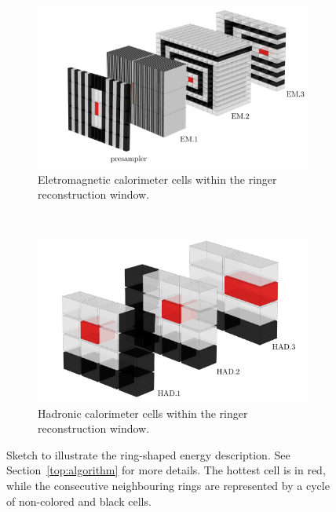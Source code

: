 \begin{figure}[h!t]
	\centering
	\begin{center}
		\begin{subfigure}[c]{0.8\textwidth}
			\centering
			\includegraphics[width=\textwidth]{sections/ringer/figures/ATLAS_EM_Layers_v5.pdf}
			\caption{Eletromagnetic calorimeter cells within the ringer reconstruction window.}
		\end{subfigure} \\
		\begin{subfigure}[c]{0.8\textwidth}
			\centering
			\includegraphics[width=\textwidth]{sections/ringer/figures/ATLAS_HAD_Layers_v5.pdf}
			\caption{Hadronic calorimeter cells within the ringer reconstruction window.}
		\end{subfigure}
	\end{center}
	\caption{\label{fig:calo_rings}
		Sketch to illustrate the ring-shaped energy description. See
		Section~\ref{top:algorithm} for more details. 
		The hottest cell is in red, while the consecutive neighbouring rings are represented by a cycle 
		of non-colored and black cells.
	}
\end{figure}

